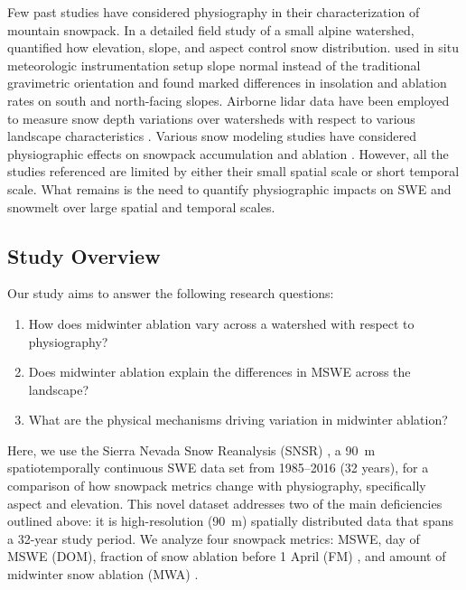 Few past studies have considered physiography in their characterization of mountain snowpack. In a detailed field study of a small alpine watershed, \cite{elderSnowAccumulationDistribution1991} quantified how elevation, slope, and aspect control snow distribution. \cite{pomeroyVariationSurfaceEnergetics2003} used in situ meteorologic instrumentation setup slope normal instead of the traditional gravimetric orientation and found marked differences in insolation and ablation rates on south and north-facing slopes. Airborne lidar data have been employed to measure snow depth variations over watersheds with respect to various landscape characteristics \citep{kirchnerLiDARMeasurementSeasonal2014, tennantRegionalSensitivitiesSeasonal2017}. Various snow modeling studies have considered physiographic effects on snowpack accumulation and ablation \citep{broxtonForestCoverTopography2020,mazzottiCanopyStructureTopography2023, lopez-morenoEffectSlopeAspect2014}. However, all the studies referenced are limited by either their small spatial scale or short temporal scale. What remains is the need to quantify physiographic impacts on SWE and snowmelt over large spatial and temporal scales. 

\subsection{Study Overview}
Our study aims to answer the following research questions:

\begin{enumerate}
    \item How does midwinter ablation vary across a watershed with respect to physiography?

    \item Does midwinter ablation explain the differences in MSWE across the landscape?
    
    \item What are the physical mechanisms driving variation in midwinter ablation?
\end{enumerate}
 
Here, we use the Sierra Nevada Snow Reanalysis (SNSR) \citep{margulisLandsatEraSierraNevada2016}, a 90~m spatiotemporally continuous SWE data set from 1985--2016 (32 years), for a comparison of how snowpack metrics change with physiography, specifically aspect and elevation. This novel dataset addresses two of the main deficiencies outlined above: it is high-resolution (90~m) spatially distributed data that spans a 32-year study period. We analyze four snowpack metrics: MSWE, day of MSWE (DOM), fraction of snow ablation before 1 April (FM) \citep{musselmanWinterMeltTrends2021}, and amount of midwinter snow ablation (MWA) \citep{harpoldHumidityDeterminesSnowpack2018}. 

